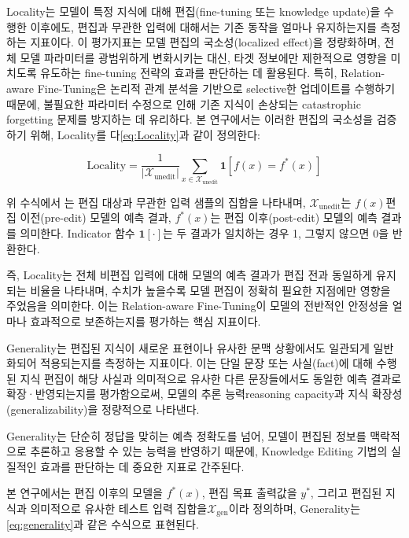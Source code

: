 \documentclass[a4paper,fleqn]{cas-sc}
\begin{document}
Locality는 모델이 특정 지식에 대해 편집(fine-tuning 또는 knowledge update)을 수행한 이후에도, 편집과 무관한 입력에 대해서는 기존 동작을 얼마나 유지하는지를 측정하는 지표이다. 이 평가지표는 모델 편집의 국소성(localized effect)을 정량화하며, 전체 모델 파라미터를 광범위하게 변화시키는 대신, 타겟 정보에만 제한적으로 영향을 미치도록 유도하는 fine-tuning 전략의 효과를 판단하는 데 활용된다.
특히, Relation-aware Fine-Tuning은 논리적 관계 분석을 기반으로 selective한 업데이트를 수행하기 때문에, 불필요한 파라미터 수정으로 인해 기존 지식이 손상되는 catastrophic forgetting 문제를 방지하는 데 유리하다. 본 연구에서는 이러한 편집의 국소성을 검증하기 위해, Locality를 다\cref{eq:Locality}과 같이 정의한다:


\begin{equation}
    \text{Locality} = \frac{1}{\left| \mathcal{X}_{\text{unedit}} \right|} \sum_{x \in \mathcal{X}_{\text{unedit}}} \mathbf{1} \left[ f(x) = f^*(x) \right]
    \label{eq:Locality}
\end{equation}
    
위 수식에서 ​는 편집 대상과 무관한 입력 샘플의 집합을 나타내며, \( \mathcal{X}_{\text{unedit}} \)는  $f(x)$편집 이전(pre-edit) 모델의 예측 결과, $f^*(x)$는 편집 이후(post-edit) 모델의 예측 결과를 의미한다. Indicator 함수 $\mathbf{1}[\cdot]$는 두 결과가 일치하는 경우 1, 그렇지 않으면 0을 반환한다.

즉, Locality는 전체 비편집 입력에 대해 모델의 예측 결과가 편집 전과 동일하게 유지되는 비율을 나타내며, 수치가 높을수록 모델 편집이 정확히 필요한 지점에만 영향을 주었음을 의미한다. 이는 Relation-aware Fine-Tuning이 모델의 전반적인 안정성을 얼마나 효과적으로 보존하는지를 평가하는 핵심 지표이다.

Generality는 편집된 지식이 새로운 표현이나 유사한 문맥 상황에서도 일관되게 일반화되어 적용되는지를 측정하는 지표이다. 이는 단일 문장 또는 사실(fact)에 대해 수행된 지식 편집이 해당 사실과 의미적으로 유사한 다른 문장들에서도 동일한 예측 결과로 확장·반영되는지를 평가함으로써, 모델의 추론 능력reasoning capacity과 지식 확장성(generalizability)을 정량적으로 나타낸다.

Generality는 단순히 정답을 맞히는 예측 정확도를 넘어, 모델이 편집된 정보를 맥락적으로 추론하고 응용할 수 있는 능력을 반영하기 때문에, Knowledge Editing 기법의 실질적인 효과를 판단하는 데 중요한 지표로 간주된다.

본 연구에서는 편집 이후의 모델을 $f^*(x)$, 편집 목표 출력값을 $y^*$, 그리고 편집된 지식과 의미적으로 유사한 테스트 입력 집합을 ​\( \mathcal{X}_{\text{gen}} \)이라 정의하며, Generality는 \cref{eq:generality}과 같은 수식으로 표현된다.
\end{document}
